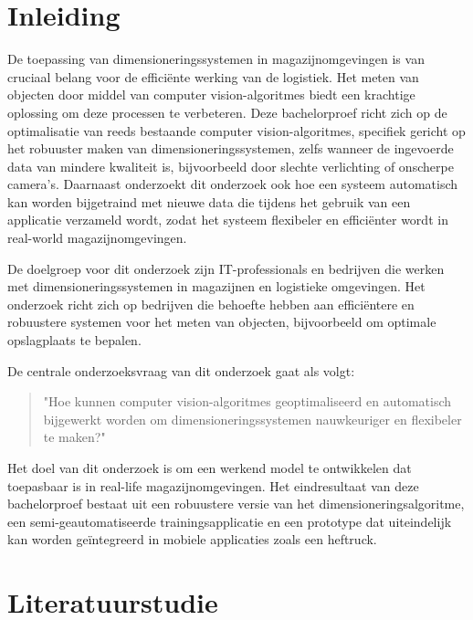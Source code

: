 
\section{Inleiding}
\label{sec:inleiding}

De toepassing van dimensioneringssystemen in magazijnomgevingen is van cruciaal belang voor de efficiënte werking van de logistiek. Het meten van objecten door middel van computer vision-algoritmes biedt een krachtige oplossing om deze processen te verbeteren. Deze bachelorproef richt zich op de optimalisatie van reeds bestaande computer vision-algoritmes, specifiek gericht op het robuuster maken van dimensioneringssystemen, zelfs wanneer de ingevoerde data van mindere kwaliteit is, bijvoorbeeld door slechte verlichting of onscherpe camera's. Daarnaast onderzoekt dit onderzoek ook hoe een systeem automatisch kan worden bijgetraind met nieuwe data die tijdens het gebruik van een applicatie verzameld wordt, zodat het systeem flexibeler en efficiënter wordt in real-world magazijnomgevingen. 

De doelgroep voor dit onderzoek zijn IT-professionals en bedrijven die werken met dimensioneringssystemen in magazijnen en logistieke omgevingen. Het onderzoek richt zich op bedrijven die behoefte hebben aan efficiëntere en robuustere systemen voor het meten van objecten, bijvoorbeeld om optimale opslagplaats te bepalen.

De centrale onderzoeksvraag van dit onderzoek gaat als volgt: 
\begin{quote}
    "Hoe kunnen computer vision-algoritmes geoptimaliseerd en automatisch bijgewerkt worden om dimensioneringssystemen nauwkeuriger en flexibeler te maken?"
\end{quote}

Het doel van dit onderzoek is om een werkend model te ontwikkelen dat toepasbaar is in real-life magazijnomgevingen. Het eindresultaat van deze bachelorproef bestaat uit een robuustere versie van het dimensioneringsalgoritme, een semi-geautomatiseerde trainingsapplicatie en een prototype dat uiteindelijk kan worden geïntegreerd in mobiele applicaties zoals een heftruck.


\section{Literatuurstudie}
\label{sec:literatuurstudie}

